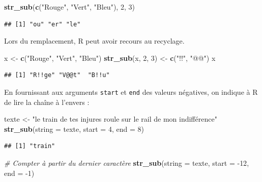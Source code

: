 \documentclass[
  11pt,
]{book}
\newenvironment{Shaded}{\begin{snugshade}}{\end{snugshade}}
\newcommand{\CommentTok}[1]{\textcolor[rgb]{0.56,0.35,0.01}{\textit{#1}}}
\newcommand{\DataTypeTok}[1]{\textcolor[rgb]{0.13,0.29,0.53}{#1}}
\newcommand{\DecValTok}[1]{\textcolor[rgb]{0.00,0.00,0.81}{#1}}
\newcommand{\KeywordTok}[1]{\textcolor[rgb]{0.13,0.29,0.53}{\textbf{#1}}}
\newcommand{\NormalTok}[1]{#1}
\newcommand{\StringTok}[1]{\textcolor[rgb]{0.31,0.60,0.02}{#1}}
\numberwithin{equation}{section}
\numberwithin{countremarque}{section}
\begin{document}
\begin{Shaded}
\begin{Highlighting}[]
\KeywordTok{str\_sub}\NormalTok{(}\KeywordTok{c}\NormalTok{(}\StringTok{"Rouge"}\NormalTok{, }\StringTok{"Vert"}\NormalTok{, }\StringTok{"Bleu"}\NormalTok{), }\DecValTok{2}\NormalTok{, }\DecValTok{3}\NormalTok{)}
\end{Highlighting}
\end{Shaded}

\begin{lstlisting}
## [1] "ou" "er" "le"
\end{lstlisting}

Lors du remplacement, R peut avoir recours au recyclage.

\begin{Shaded}
\begin{Highlighting}[]
\NormalTok{x \textless{}{-}}\StringTok{ }\KeywordTok{c}\NormalTok{(}\StringTok{"Rouge"}\NormalTok{, }\StringTok{"Vert"}\NormalTok{, }\StringTok{"Bleu"}\NormalTok{)}
\KeywordTok{str\_sub}\NormalTok{(x, }\DecValTok{2}\NormalTok{, }\DecValTok{3}\NormalTok{) \textless{}{-}}\StringTok{ }\KeywordTok{c}\NormalTok{(}\StringTok{"!!"}\NormalTok{, }\StringTok{"@@"}\NormalTok{)}
\NormalTok{x}
\end{Highlighting}
\end{Shaded}

\begin{lstlisting}
## [1] "R!!ge" "V@@t"  "B!!u"
\end{lstlisting}

En fournissant aux arguments \texttt{start} et \texttt{end} des valeurs négatives, on indique à R de lire la chaîne à l'envers :

\begin{Shaded}
\begin{Highlighting}[]
\NormalTok{texte \textless{}{-}}\StringTok{ "le train de tes injures roule sur le rail de mon indifférence"}
\KeywordTok{str\_sub}\NormalTok{(}\DataTypeTok{string =}\NormalTok{ texte, }\DataTypeTok{start =} \DecValTok{4}\NormalTok{, }\DataTypeTok{end =} \DecValTok{8}\NormalTok{)}
\end{Highlighting}
\end{Shaded}

\begin{lstlisting}
## [1] "train"
\end{lstlisting}

\begin{Shaded}
\begin{Highlighting}[]
\CommentTok{\# Compter à partir du dernier caractère}
\KeywordTok{str\_sub}\NormalTok{(}\DataTypeTok{string =}\NormalTok{ texte, }\DataTypeTok{start =} \DecValTok{{-}12}\NormalTok{, }\DataTypeTok{end =} \DecValTok{{-}1}\NormalTok{)}
\end{Highlighting}
\end{Shaded}
\end{document}

